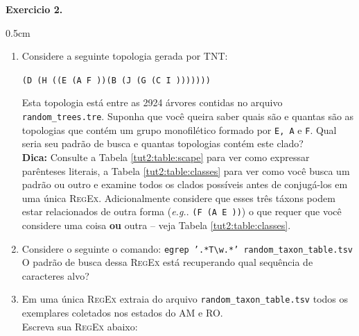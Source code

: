 \begin{refsection}
\begin{blackBlock}{\textbf{Exercicio 2.}}\label{tut2:ex:2.\arabic{ex}}
\begin {myindentpar}{0.5cm}
\begin{enumerate}[\itshape i.]
 \item{Considere a seguinte topologia gerada por TNT:}\label{tut2:regex:modifiers:ex1}\\

\begin{center}
\texttt{(D (H ((E (A F ))(B (J (G (C I )))))))}\\
\end{center}

	Esta topologia está entre as 2924 árvores contidas no arquivo \texttt{random\_trees.tre}. Suponha que você queira saber quais são e quantas são as topologias que contém um grupo monofilético formado por \texttt{E, A} e \texttt{F}. Qual seria seu padrão de busca e quantas topologias contém este clado?\\
\textbf{Dica:} Consulte a Tabela \ref{tut2:table:scape} para ver como expressar parênteses literais, a Tabela \ref{tut2:table:classes} para ver como você busca um padrão ou outro e examine todos os clados possíveis antes de conjugá-los em uma única \textsc{RegEx}. Adicionalmente considere que esses três táxons podem estar relacionados de outra forma (\textit{e.g.}. \texttt{(F (A E ))}) o que requer que você considere uma coisa \textbf{ou} outra -- veja Tabela \ref{tut2:table:classes}.\\

 \item{Considere o seguinte o comando: \texttt{egrep '.*T\textbackslash w.*' random\_taxon\_table.tsv}}\label{tut2:regex:modifiers:ex2}\\
	O padrão de busca dessa \textsc{RegEx} está recuperando qual sequência de caracteres alvo?\\

 \item{Em uma única \textsc{RegEx} extraia do arquivo \texttt{random\_taxon\_table.tsv} todos os exemplares coletados nos estados do AM e RO.}\label{tut2:regex:modifiers:ex3}\\
	Escreva sua \textsc{RegEx} abaixo:\\

\\

\end{enumerate}
\end{myindentpar}
\end{blackBlock}


\end{refsection}
